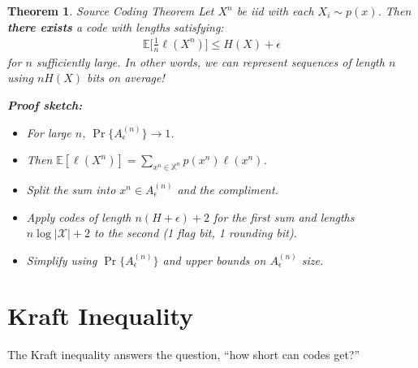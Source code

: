 \documentclass[a4paper,12pt]{report}
\newtheorem{theorem}{Theorem}
\begin{document}
\begin{theorem}{Source Coding Theorem}
Let $X^n$ be iid with each $X_i \sim p(x)$. Then \textbf{there exists} a code
with lengths satisfying: 
\begin{align}
	\label{eqn:source_coding_theorem}
	\mathbb E\big[ \frac{1}{n} \ell(X^n) \big] \leq H(X) + \epsilon
\end{align}
for $n$ sufficiently large. In other words, we can represent sequences of length
$n$ using $nH(X)$ bits on average!

\textbf{Proof sketch:} 
\begin{itemize}
\item For large $n$, $\Pr\{A_\epsilon^{(n)}\} \to 1$.
\item Then $\mathbb E[\ell(X^n)] = \sum_{x^n\in \mathbb X^n} p(x^n) \ell(x^n)$.
\item Split the sum into $x^n \in A_\epsilon^{(n)}$ and the compliment.
\item Apply codes of length $n(H+\epsilon) + 2$ for the first sum and lengths $n
\log |\mathcal X| + 2$ to the second (1 flag bit, 1 rounding bit).
\item Simplify using $\Pr\{A_\epsilon^{(n)}\}$ and upper bounds on
$A_\epsilon^{(n)}$ size.
\end{itemize}
\end{theorem}





\section{Kraft Inequality}

The Kraft inequality answers the question, ``how short can codes get?''
\end{document}
